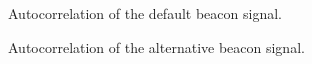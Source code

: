 \documentclass[final]{scrreprt} %
\begin{document}
\begin{figure}[H]
	\centering
	\setlength\figureheight{4cm}
    	\setlength{}
	
	\caption{Autocorrelation of the default beacon signal.}
	\label{fig:default-correlation}
\end{figure}

\begin{figure}[H]
	\centering
	\setlength\figureheight{4cm}
    	\setlength{}
	
	\caption{Autocorrelation of the alternative beacon signal.}
	\label{fig:own-correlation}
\end{figure}
\end{document}

